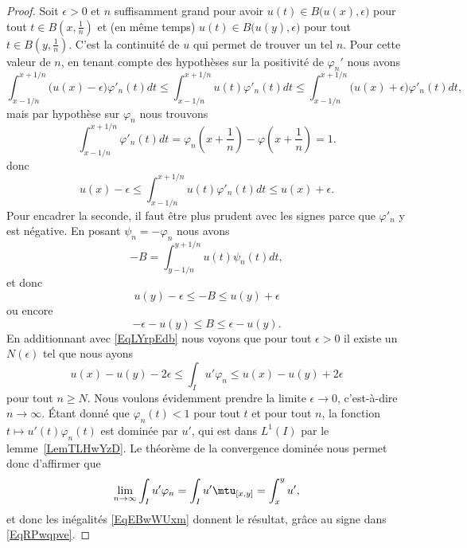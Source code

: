 \begin{proof}
	Soit \( \epsilon>0\) et \( n\) suffisamment grand pour avoir \( u(t)\in B\big( u(x),\epsilon \big)\) pour tout \( t\in B(x,\frac{1}{ n })\) et (en même temps) \( u(t)\in B\big( u(y),\epsilon \big)\) pour tout \( t\in B(y,\frac{1}{ n })\). C'est la continuité de \( u\) qui permet de trouver un tel \( n\). Pour cette valeur de \( n\), en tenant compte des hypothèses sur la positivité de \( \varphi_n'\) nous avons
	\begin{equation}
		\int_{x-1/n}^{x+1/n}\big( u(x)-\epsilon \big)\varphi'_n(t)dt\leq\int_{x-1/n}^{x+1/n}u(t)\varphi'_n(t)dt\leq\int_{x-1/n}^{x+1/n}\big( u(x)+\epsilon \big)\varphi'_n(t)dt,
	\end{equation}
	mais par hypothèse sur \( \varphi_n\) nous trouvons
	\begin{equation}
		\int_{x-1/n}^{x+1/n}\varphi'_n(t)dt=\varphi_n(x+\frac{1}{ n })-\varphi(x+\frac{1}{ n })=1.
	\end{equation}
	donc
	\begin{equation}    \label{EqLYrpEdb}
		u(x)-\epsilon\leq\int_{x-1/n}^{x+1/n}u(t)\varphi'_n(t)dt\leq u(x)+\epsilon.
	\end{equation}
	Pour encadrer la seconde, il faut être plus prudent avec les signes parce que \( \varphi'_n\) y est négative. En posant \( \psi_n=-\varphi_n\) nous avons
	\begin{equation}
		-B=\int_{y-1/n}^{y+1/n}u(t)\psi_n(t)dt,
	\end{equation}
	et donc
	\begin{equation}
		u(y)-\epsilon\leq -B\leq u(y)+\epsilon
	\end{equation}
	ou encore
	\begin{equation}
		-\epsilon-u(y)\leq B\leq \epsilon-u(y).
	\end{equation}
	En additionnant avec \eqref{EqLYrpEdb} nous voyons que pour tout \( \epsilon>0\) il existe un \( N(\epsilon)\) tel que nous ayons
	\begin{equation}    \label{EqEBwWUxm}
		u(x)-u(y)-2\epsilon\leq\int_Iu'\varphi_{n}\leq u(x)-u(y)+2\epsilon
	\end{equation}
	pour tout \( n\geq N\). Nous voulons évidemment prendre la limite \( \epsilon\to 0\), c'est-à-dire \( n\to \infty\). Étant donné que \( \varphi_n(t)<1\) pour tout \( t\) et pour tout \( n\), la fonction \( t\mapsto u'(t)\varphi_n(t)\) est dominée par \( u'\), qui est dans \( L^1(I)\) par le lemme~\ref{LemTLHwYzD}. Le théorème de la convergence dominée nous permet donc d'affirmer que
	\begin{equation}
		\lim_{n\to \infty} \int_Iu'\varphi_n=\int_Iu'\mtu_{[x,y]}=\int_x^yu',
	\end{equation}
	et donc les inégalités \eqref{EqEBwWUxm} donnent le résultat, grâce au signe dans \eqref{EqRPwqpve}.
\end{proof}

